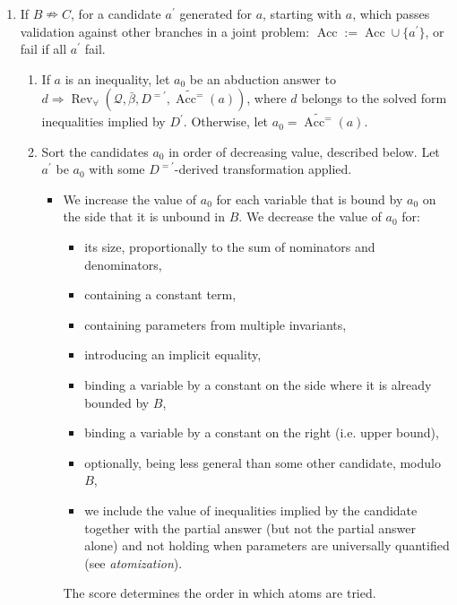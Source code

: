 \documentclass{article}
\newcommand{\assign}{:=}
\newcommand{\tmem}[1]{{\em #1\/}}
\newcommand{\tmop}[1]{\ensuremath{\operatorname{#1}}}
\begin{document}
\begin{enumerate}
  \item If $B \nRightarrow C$, for a candidate $a^{\prime}$ generated for $a$,
  starting with $a$, which passes validation against other branches in a joint
  problem: $\tmop{Acc} \assign \tmop{Acc} \cup \{ a^{\prime} \}$, or fail if
  all $a^{\prime}$ fail.
  \begin{enumerate}
    \item If $a$ is an inequality, let $a_0$ be an abduction answer to $d
    \Rightarrow \tmop{Rev}_{\forall} (\mathcal{Q}, \bar{\beta}, D^{=\prime},
    \widetilde{\tmop{Acc}^=} (a))$, where $d$ belongs to the solved form
    inequalities implied by $D^{\prime}$. Otherwise, let $a_0 =
    \widetilde{\tmop{Acc}^=} (a)$.
    
    \item Sort the candidates $a_0$ in order of decreasing value, described
    below. Let $a^{\prime}$ be $a_0$ with some $D^{=\prime}$-derived
    transformation applied.
    \begin{itemize}
      \item We increase the value of $a_0$ for each variable that is bound by
      $a_0$ on the side that it is unbound in $B$. We decrease the value of
      $a_0$ for:
      \begin{itemize}
        \item its size, proportionally to the sum of nominators and
        denominators,
        
        \item containing a constant term,
        
        \item containing parameters from multiple invariants,
        
        \item introducing an implicit equality,
        
        \item binding a variable by a constant on the side where it is already
        bounded by $B$,
        
        \item binding a variable by a constant on the right (i.e. upper
        bound),
        
        \item optionally, being less general than some other candidate, modulo
        $B$,
        
        \item we include the value of inequalities implied by the candidate
        together with the partial answer (but not the partial answer alone)
        and not holding when parameters are universally quantified (see
        {\tmem{atomization}}).
      \end{itemize}
      The score determines the order in which atoms are tried.
      

\end{itemize}
\end{enumerate}
\end{enumerate}
\end{document}
